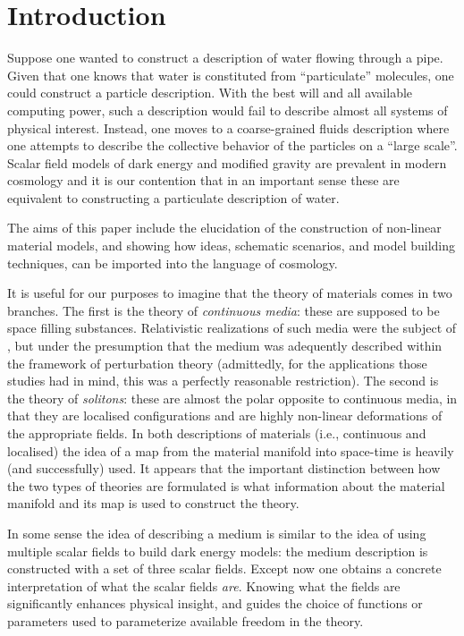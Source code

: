 \cleardoublepage
\section{Introduction}

Suppose one wanted to construct a description of water flowing through a pipe. Given that one knows that water is constituted from ``particulate'' molecules,  one could construct a particle description. With the best will and all available computing power, such a description would fail to describe almost all systems of physical interest. Instead, one moves to a coarse-grained fluids description where one attempts to describe the collective behavior of the particles on a ``large scale''.  Scalar field models of dark energy and modified gravity are prevalent in modern cosmology and it is our contention that in an important sense these are equivalent to constructing a particulate description of water.

The aims of this paper include the elucidation of the construction of non-linear material models, and  showing how ideas, schematic scenarios, and model building techniques, can be imported into the language of cosmology.

It is useful for our purposes to imagine that the theory of materials comes in two branches. The first is the theory of   \textit{continuous media}: these are supposed to be space filling substances. Relativistic realizations of such media were the subject of \cite{Bucher:1998mh, Battye:2007aa, Pearson:2014iaa}, but under the presumption that the medium was adequently described within the framework of perturbation theory (admittedly,  for the applications those studies had in mind, this was a perfectly reasonable restriction).  The second is the theory of \textit{solitons}: these are almost the polar opposite to continuous media, in that they are localised configurations and are highly non-linear deformations of the appropriate fields. In both descriptions of materials (i.e., continuous and localised) the idea of a map from the material manifold into space-time is heavily (and successfully) used. It appears that the important distinction between how the two types of theories are formulated is what information about the material manifold and its map is used to construct the theory.

In some sense the idea of describing a medium is similar to the idea of using multiple scalar fields to build dark energy models: the medium description is constructed with a set of three scalar fields. Except now one obtains a concrete interpretation of what the scalar fields \textit{are}. Knowing what the fields are significantly enhances physical insight, and guides the choice of  functions or parameters used to parameterize available freedom in the theory.

